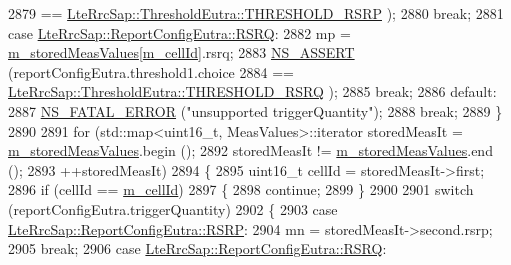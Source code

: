 \begin{DoxyCode}
2879                        == \hyperlink{structns3_1_1LteRrcSap_1_1ThresholdEutra_ad3ed2704b836132980dd2e97cb03822ca0663d5baa9382bd755acb712f6ebf707}{LteRrcSap::ThresholdEutra::THRESHOLD\_RSRP}
      );
2880             \textcolor{keywordflow}{break};
2881           \textcolor{keywordflow}{case} \hyperlink{structns3_1_1LteRrcSap_1_1ReportConfigEutra_a82343ddf526faba0483431ea5882a3efaa4e09cb3c7154d7ab732115a2647325f}{LteRrcSap::ReportConfigEutra::RSRQ}:
2882             mp = \hyperlink{classns3_1_1LteUeRrc_a93094dcd5c235b2e2a8a299125100a57}{m\_storedMeasValues}[\hyperlink{classns3_1_1LteUeRrc_aa9d3317734eea9158371d9fccf3a0c48}{m\_cellId}].rsrq;
2883             \hyperlink{assert_8h_a6dccdb0de9b252f60088ce281c49d052}{NS\_ASSERT} (reportConfigEutra.threshold1.choice
2884                        == \hyperlink{structns3_1_1LteRrcSap_1_1ThresholdEutra_ad3ed2704b836132980dd2e97cb03822ca6e8bda2b99825f09f53388c29b6402b4}{LteRrcSap::ThresholdEutra::THRESHOLD\_RSRQ}
      );
2885             \textcolor{keywordflow}{break};
2886           \textcolor{keywordflow}{default}:
2887             \hyperlink{group__fatal_ga5131d5e3f75d7d4cbfd706ac456fdc85}{NS\_FATAL\_ERROR} (\textcolor{stringliteral}{"unsupported triggerQuantity"});
2888             \textcolor{keywordflow}{break};
2889           \}
2890 
2891         \textcolor{keywordflow}{for} (std::map<uint16\_t, MeasValues>::iterator storedMeasIt = 
      \hyperlink{classns3_1_1LteUeRrc_a93094dcd5c235b2e2a8a299125100a57}{m\_storedMeasValues}.begin ();
2892              storedMeasIt != \hyperlink{classns3_1_1LteUeRrc_a93094dcd5c235b2e2a8a299125100a57}{m\_storedMeasValues}.end ();
2893              ++storedMeasIt)
2894           \{
2895             uint16\_t cellId = storedMeasIt->first;
2896             \textcolor{keywordflow}{if} (cellId == \hyperlink{classns3_1_1LteUeRrc_aa9d3317734eea9158371d9fccf3a0c48}{m\_cellId})
2897               \{
2898                 \textcolor{keywordflow}{continue};
2899               \}
2900 
2901             \textcolor{keywordflow}{switch} (reportConfigEutra.triggerQuantity)
2902               \{
2903               \textcolor{keywordflow}{case} \hyperlink{structns3_1_1LteRrcSap_1_1ReportConfigEutra_a82343ddf526faba0483431ea5882a3efa5b7591e86ab7bcefc7fe1528762114d7}{LteRrcSap::ReportConfigEutra::RSRP}:
2904                 mn = storedMeasIt->second.rsrp;
2905                 \textcolor{keywordflow}{break};
2906               \textcolor{keywordflow}{case} \hyperlink{structns3_1_1LteRrcSap_1_1ReportConfigEutra_a82343ddf526faba0483431ea5882a3efaa4e09cb3c7154d7ab732115a2647325f}{LteRrcSap::ReportConfigEutra::RSRQ}:

\end{DoxyCode}
